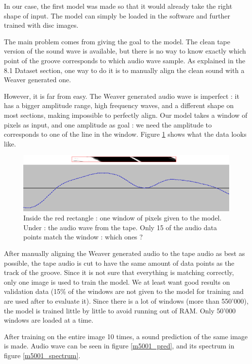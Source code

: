 \documentclass[12pt, twoside]{article}
\begin{document}
In our case, the first model was made so that it would already take the right shape of input. The model can simply be loaded in the software and further trained with disc images.

The main problem comes from giving the goal to the model. The clean tape version of the sound wave is available, but there is no way to know exactly which point of the groove corresponds to which audio wave sample. As explained in the 8.1 Dataset section, one way to do it is to manually align the clean sound with a Weaver generated one. 

However, it is far from easy. The Weaver generated audio wave is imperfect : it has a bigger amplitude range, high frequency waves, and a different shape on most sections, making impossible to perfectly align. Our model takes a window of pixels as input, and one amplitude as goal : we need the amplitude to corresponds to one of the line in the window. Figure \ref{proto4_matching_detal} shows what the data looks like.

\begin{figure}
	\centering
	\includegraphics[width=1.0\textwidth]{../images/proto4_matching_detal.png}
	\caption{Inside the red rectangle : one window of pixels given to the model. Under : the audio wave from the tape. Only 15 of the audio data points match the window : which ones ?}
	\label{proto4_matching_detal}
\end{figure}

After manually aligning the Weaver generated audio to the tape audio as best as possible, the tape audio is cut to have the same amount of data points as the track of the groove. Since it is not sure that everything is matching correctly, only one image is used to train the model. We at least want good results on validation data (15\% of the windows are not given to the model for training and are used after to evaluate it).
Since there is a lot of windows (more than 550'000), the model is trained little by little to avoid running out of RAM. Only 50'000 windows are loaded at a time.

After training on the entire image 10 times, a sound prediction of the same image is made. Audio wave can be seen in figure \ref{m5001_pred}, and its spectrum in figure \ref{m5001_spectrum}.
\end{document}
